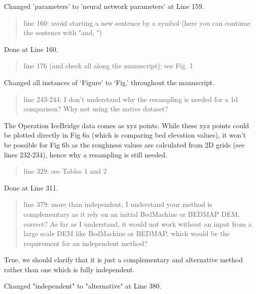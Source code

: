 \documentclass{article}
\begin{document}
{
  \color{ForestGreen}
  Changed 'parameters' to 'neural network parameters' at Line 159.
}

\begin{quote}
\color{blue}
line 160: avoid starting a new sentence by a symbol (here you can continue the sentence with "and, ")
\end{quote}

{
  \color{ForestGreen}
  Done at Line 160.
}

\begin{quote}
\color{blue}
line 176 (and check all along the manuscript): see Fig. 1
\end{quote}

{
  \color{ForestGreen}
  Changed all instances of `Figure' to `Fig.' throughout the manuscript.
}

\begin{quote}
\color{blue}
line 243-244: I don't understand why the resampling is needed for a 1d comparison? Why not using the native dataset?
\end{quote}

The Operation IceBridge data comes as xyz points.
While these xyz points could be plotted directly in Fig 6a (which is comparing bed elevation values), it won't be possible for Fig 6b as the roughness values are calculated from 2D grids (see lines 232-234), hence why a resampling is still needed.


\begin{quote}
\color{blue}
line 329: see Tables 1 and 2
\end{quote}

{
  \color{ForestGreen}
  Done at Line 311.
}

\begin{quote}
\color{blue}
line 379: more than independent, I understand your method is complementary as it rely on an initial BedMachine or BEDMAP DEM, correct? As far as I understand, it would not work without an input from a large scale DEM like BedMachine or BEDMAP, which would be the requirement for an independent method?
\end{quote}

True, we should clarify that it is just a complementary and alternative method rather than one which is fully independent.

{
  \color{ForestGreen}
  Changed "independent" to "alternative" at Line 380.
}
\end{document}
